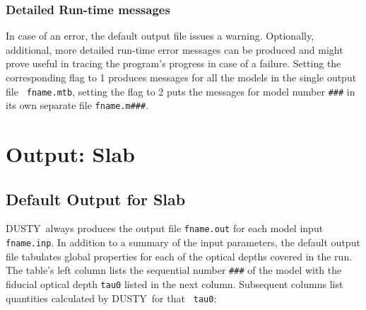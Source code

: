\documentclass[11pt]{article}
\def\D    {{\sf DUSTY}}
\begin{document}
\subsubsection{Detailed Run-time messages}
\label{sec:error_sph}

In case of an error, the default output file issues a
warning. Optionally, additional, more detailed run-time error messages
can be produced and might prove useful in tracing the program's
progress in case of a failure. Setting the corresponding flag to 1
produces messages for all the models in the single output file {\tt
  fname.mtb}, setting the flag to 2 puts the messages for model number
{\tt \#\#\#} in its own separate file {\tt fname.m\#\#\#}.


\section{Output: Slab}
\label{sec:output_slb}

\subsection{Default Output for Slab}
\label{sec:default_slb}

\D\ always produces the output file {\tt fname.out} for each model
input {\tt fname.inp}. In addition to a summary of the input
parameters, the default output file tabulates global properties for
each of the optical depths covered in the run. The table's left column
lists the sequential number {\tt \#\#\#} of the model with the
fiducial optical depth {\tt tau0} listed in the next column.
Subsequent columns list quantities calculated by \D\ for that {\tt
  tau0}:
\end{document}
